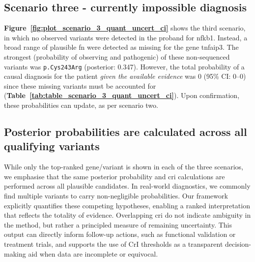 

\FloatBarrier
\subsection{Scenario three - currently impossible diagnosis}

\textbf{Figure~\ref{fig:plot_scenario_3_quant_uncert_ci}} shows the third scenario, in which no observed variants were detected in the proband for \ac{nfkb1}. 
Instead, a broad range of plausible \ac{fn} were detected as missing for the gene \ac{tnfaip3}.
The strongest (probability of observing and pathogenic) of these non-sequenced variants was \texttt{p.Cys243Arg} (posterior: 0.347). 
However, the total probability of a causal diagnosis for the patient \emph{given the available evidence} was 0 (95\% CI: 0--0) since these missing variants must be accounted for (\textbf{Table~\ref{tab:table_scenario_3_quant_uncert_ci}}). 
Upon confirmation, these probabilities can update, as per scenario two.

\subsection{Posterior probabilities are calculated across all qualifying variants}

While only the top-ranked gene/variant is shown in each of the three scenarios, we emphasise that the same posterior probability and \ac{cri} calculations are performed across all plausible candidates. 
In real-world diagnostics, we commonly find multiple variants to carry non-negligible probabilities. 
Our framework explicitly quantifies these competing hypotheses, enabling a ranked interpretation that reflects the totality of evidence. 
Overlapping \ac{cri} do not indicate ambiguity in the method, but rather a principled measure of remaining uncertainty. 
This output can directly inform follow-up actions, such as functional validation or treatment trials, and supports the use of CrI thresholds as a transparent decision-making aid when data are incomplete or equivocal.


